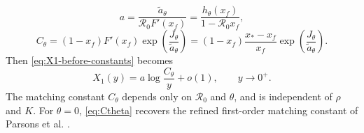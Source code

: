 \documentclass[11pt]{article}
\newcommand{\Rzero}{\mathcal R_0}
\newcommand{\rhoeps}{\rho}
\newcommand{\hth}{h_\theta}
\newcommand{\xf}{x_f}
\newcommand{\xs}{x_*}
\newcommand{\Cth}{C_\theta}
\begin{document}
\begin{equation}
a=\frac{\widetilde a_\theta}{\Rzero F'(\xf)}
=\frac{\hth(\xf)}{1-\Rzero\xf},
\label{eq:a}
\end{equation}
\begin{equation}
\Cth=(1-\xf)F'(\xf)\exp\left(\frac{J_\theta}{\widetilde a_\theta}\right)
=(1-\xf)\frac{\xs-\xf}{\xf}\exp\left(\frac{J_\theta}{\widetilde a_\theta}\right).
\label{eq:Ctheta}
\end{equation}
Then \cref{eq:X1-before-constants} becomes
\begin{equation}
X_1(y)=a\log\frac{\Cth}{y}+o(1),\qquad y\to0^+.
\label{eq:X1asymp}
\end{equation}
The matching constant \(\Cth\) depends only on \(\Rzero\) and \(\theta\), and is independent of \(\rhoeps\) and \(K\). For \(\theta=0\), \cref{eq:Ctheta} recovers the refined first-order matching constant of Parsons et al. \cite{ParsonsEtAl2024}.
\end{document}
